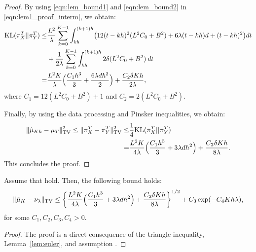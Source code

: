 \begin{proof}
By using \eqref{eqn:lem_bound1} and \eqref{eqn:lem_bound2} in \eqref{eqn:lem1_proof_interm}, we obtain:
\begin{align}
\nonumber \textnormal{KL} (\pi_{X}^T || \pi_{Y}^T) \leq& \frac{L^2}{\lambda} \sum_{k=0}^{K-1} \int_{kh}^{(k+1)h} \bigl(12(t-kh)^2 (L^2 C_0 + B^2) + 6\lambda (t-kh)d +(t-kh)^2 \bigr) dt\\
&+  \frac1{2 \lambda} \sum_{k=0}^{K-1} \int_{kh}^{(k+1)h} 2 \delta(L^2 C_0 + B^2) \> dt \\
=& \frac{L^2 K}{\lambda} \Bigl( \frac{C_1 h^3}{3} + \frac{6 \lambda d h^2}{2} \Bigr) + \frac{C_2 \delta K h}{2\lambda},
\end{align}
where $C_1 = 12(L^2 C_0 + B^2)+1$ and $C_2 = 2 (L^2 C_0 + B^2)$.

Finally, by using the data processing and Pinsker inequalities, we obtain:
\begin{align}
\| \hat{\mu}_{Kh} - \mu_{T} \|_{\textnormal{TV}}^2 \leq \| \pi_{X}^T - \pi_{Y}^T \|_{\textnormal{TV}}^2 \leq& \frac1{4} \textnormal{KL} (\pi_{X}^T || \pi_{Y}^T) \\
=& \frac{L^2 K}{4\lambda} \Bigl( \frac{C_1 h^3}{3} + 3 \lambda d h^2 \Bigr) + \frac{C_2 \delta K h}{8\lambda}.
\end{align}
This concludes the proof.

\end{proof}


\begin{thm}
Assume that  hold. Then, the following bound holds:
\begin{align}
\| \hat{\mu}_{K} - \nu_\lambda \|_{\textnormal{TV}} \leq \left \lbrace  \frac{L^2 K}{4\lambda} \Bigl( \frac{C_1 h^3}{3} + 3 \lambda d h^2 \Bigr) + \frac{C_2  \delta K h}{8\lambda} \right \rbrace^{1/2} +  C_3 \exp(-C_4 Kh \lambda),
\end{align}
for some $C_1,C_2,C_3,C_4 > 0$.
\end{thm}
%
\begin{proof}
The proof is a direct consequence of the triangle inequality, Lemma~\ref{lem:euler}, and assumption .
\end{proof}

